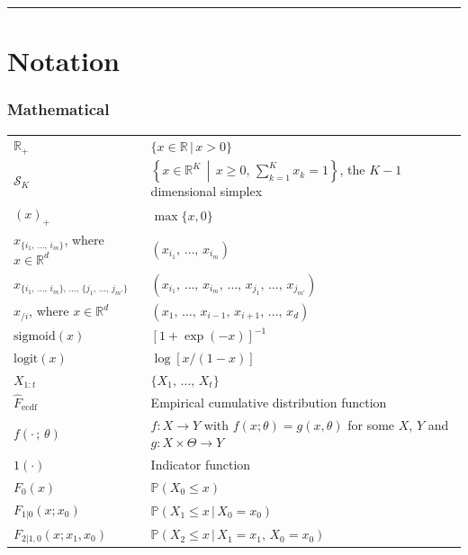\documentclass[11pt,twoside,openany]{book}
\newcommand{\prob}{\mathbb{P}}
\newcommand{\reals}{\mathbb{R}}
\numberwithin{Theorem}{chapter}
\numberwithin{Definition}{chapter}
\numberwithin{Lemma}{chapter}
\numberwithin{Algorithm}{chapter}
\numberwithin{equation}{chapter}
\begin{document}
\setcounter{page}{1}

\thispagestyle{plain}
\tableofcontents
\clearpage

\thispagestyle{plain}
\hrule
\chapter*{Notation}

\subsection*{Mathematical}
\begin{tabular}{lp{\textwidth}}
  $\reals_{+}$ & $\{x\in\reals\,|\,x > 0\}$ \\
  $\mathcal{S}_K$ & $\left\{x\in\reals^K\,\middle |\, x \geq 0,\,\sum_{k=1}^K x_k = 1\right\}$, the $K-1$ dimensional simplex \\
  $(x)_+$ & $\max\{x, 0\}$ \\
  $x_{\{i_1,\,\ldots,\,i_m\}}$, where $x\in\reals^d$ & $(x_{i_1},\,\ldots,\,x_{i_m})$ \\
  $x_{\{i_1,\,\ldots,\,i_{m}\},\,\ldots,\,\{j_{1},\,\ldots,\,j_{m'}\}}$ & $(x_{i_1},\,\ldots,\,x_{i_m},\,\ldots,\,x_{j_{1}},\,\ldots,\,x_{j_{m'}})$ \\
  $x_{/i}$, where $x\in\reals^d$ & $(x_1,\,\ldots,\,x_{i-1},\,x_{i+1},\,\ldots,\,x_d)$ \\
  $\text{sigmoid}(x)$ & $[1 + \exp(-x)]^{-1}$ \\
  $\text{logit}(x)$ & $\log\left[x/(1-x)\right]$ \\
  $X_{1:t}$ & $\{X_1,\,\ldots,\,X_t\}$ \\
  $\hat F_{\text{ecdf}}$ & Empirical cumulative distribution function \\
  $f(\cdot\,;\,\theta)$ & $f:X\rightarrow Y$ with $f(x;\theta) = g(x,\theta)$ for some $X$, $Y$ and $g : X \times \Theta \rightarrow Y$\\
  $1(\cdot)$ & Indicator function\\
  $F_{0}(x)$ & $\prob(X_0 \leq x)$\\
  $F_{1|0}(x;x_0)$ & $\prob(X_1 \leq x\,|\, X_0 = x_0)$\\
  $F_{2|1,0}(x;x_1,x_0)$ & $\prob(X_2 \leq x\,|\,X_1=x_1,\, X_0= x_0)$\\
\end{tabular}\\
\end{document}
